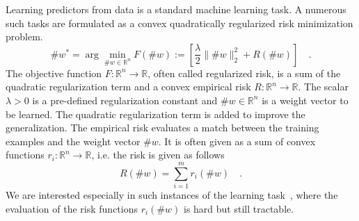 Learning predictors from data is a standard machine learning task. A numerous such tasks are formulated as a convex quadratically regularized risk minimization problem.
%
\begin{equation}
	\#w^* = \arg\min_{\#w \in \mathbb{R}^n} F(\#w) := \left[ \frac{\lambda}{2} \| \#w  \|^2_2  + R(\#w) \right] \quad. \label{eq:learning_task}
\end{equation}
%
The objective function $F:\mathbb{R}^n \rightarrow \mathbb{R}$, often called regularized risk, is a sum of the quadratic regularization term and a convex empirical risk $R:\mathbb{R}^n \rightarrow \mathbb{R}$. The scalar $\lambda > 0$ is a pre-defined regularization constant and $\#w \in \mathbb{R}^n$ is a weight vector to be learned. The quadratic regularization term is added to improve the generalization. The empirical risk evaluates a match between the training examples and the weight vector $\#w$. It is often given as a sum of convex functions $r_i: \mathbb{R}^n \rightarrow \mathbb{R}$, i.e. the risk is given as follows
%
\begin{equation}
	R(\#w) = \sum_{i=1}^m r_i(\#w) \quad.
\end{equation}
%
We are interested especially in such instances of the learning task~, where the evaluation of the risk functions $r_i(\#w)$ is hard but still tractable.

